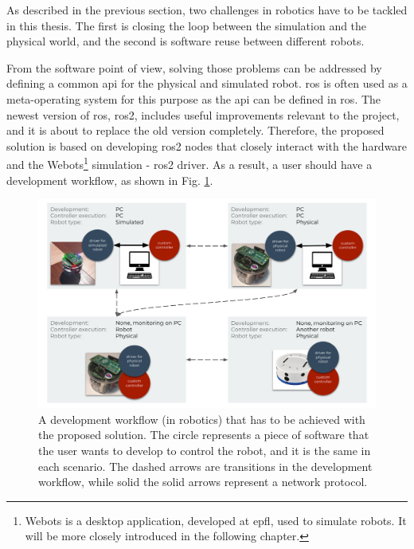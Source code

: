 As described in the previous section, two challenges in robotics have to be tackled in this thesis.
The first is closing the loop between the simulation and the physical world, and the second is software reuse between different robots.


From the software point of view, solving those problems can be addressed by defining a common \ac{api} for the physical and simulated robot.
\ac{ros} is often used as a meta-operating system for this purpose as the \ac{api} can be defined in \ac{ros}.
The newest version of \ac{ros}, \ac{ros2}, includes useful improvements relevant to the project, and it is about to replace the old version completely.
Therefore, the proposed solution is based on developing \ac{ros2} nodes that closely interact with the hardware and the Webots\footnote{Webots is a desktop application, developed at \ac{epfl}, used to simulate robots.
It will be more closely introduced in the following chapter.} simulation - \ac{ros2} driver.
As a result, a user should have a development workflow, as shown in Fig. \ref{fig:introduction:desired_workflow}.

\begin{figure}[H]
    \centering
    \includegraphics[width=\textwidth]{introduction/figures/desired_workflow.pdf}
    \caption[A development workflow (in robotics) that has to be achieved with the proposed solution]{
        A development workflow (in robotics) that has to be achieved with the proposed solution.
        The circle represents a piece of software that the user wants to develop to control the robot, and it is the same in each scenario.
        The dashed arrows are transitions in the development workflow, while solid the solid arrows represent a network protocol.
    }
    \label{fig:introduction:desired_workflow}
\end{figure}


